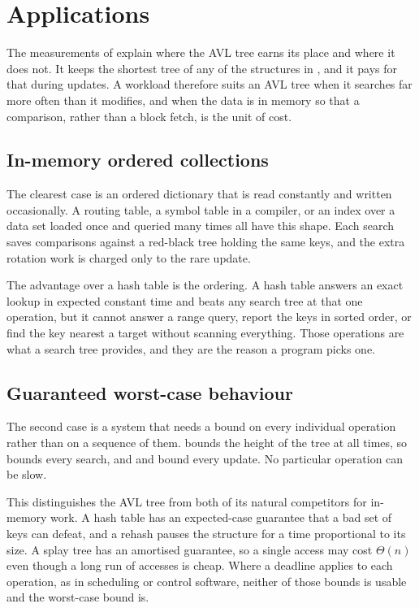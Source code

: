 \section{Applications}
\label{sec:applications}

The measurements of  explain where the AVL tree earns its place
and where it does not. It keeps the shortest tree of any of the structures in
, and it pays for that during updates. A workload therefore
suits an AVL tree when it searches far more often than it modifies, and when the
data is in memory so that a comparison, rather than a block fetch, is the unit of
cost.

\subsection{In-memory ordered collections}

The clearest case is an ordered dictionary that is read constantly and written
occasionally. A routing table, a symbol table in a compiler, or an index over a
data set loaded once and queried many times all have this shape. Each search saves
comparisons against a red-black tree holding the same keys, and the extra
rotation work is charged only to the rare update.

The advantage over a hash table is the ordering. A hash table answers an exact
lookup in expected constant time and beats any search tree at that one operation,
but it cannot answer a range query, report the keys in sorted order, or find the
key nearest a target without scanning everything. Those operations are what a
search tree provides, and they are the reason a program picks one.

\subsection{Guaranteed worst-case behaviour}

The second case is a system that needs a bound on every individual operation
rather than on a sequence of them.  bounds the height of
the tree at all times, so  bounds every search, and
 and  bound every update. No
particular operation can be slow.

This distinguishes the AVL tree from both of its natural competitors for
in-memory work. A hash table has an expected-case guarantee that a bad set of
keys can defeat, and a rehash pauses the structure for a time proportional to its
size. A splay tree has an amortised guarantee, so a single access may cost
$\Theta(n)$ even though a long run of accesses is cheap. Where a deadline applies
to each operation, as in scheduling or control software, neither of those bounds
is usable and the worst-case bound is.

